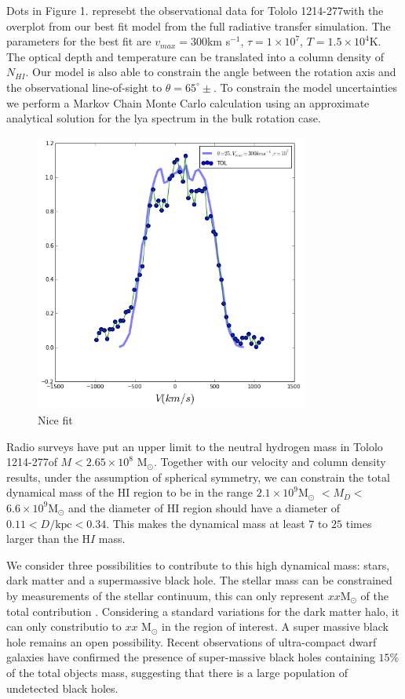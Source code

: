 \documentclass[a4paper, usenatbib, 12pt]{article}
\newcommand{\tol}{Tololo 1214-277}
\newcommand{\kms}{km s$^{-1}$}
\begin{document}
{Dots in Figure 1. represebt the observational data for \tol with the
overplot from our best fit model from the full radiative transfer
simulation.   The parameters for the best fit are
$v_{max}=300$\kms, $\tau=1\times10^7$, $T=1.5\times 10^{4}$K.
The optical depth and temperature can be translated into a column
density of $N_{HI}$. Our model is also able to constrain the angle
between the rotation axis and the observational line-of-sight to $\theta=65^{\circ}\pm$.
To constrain the model uncertainties we perform a Markov Chain Monte
Carlo calculation using an approximate analytical solution for the
lya spectrum in the bulk rotation case.


\begin{figure}
\begin{center}
\includegraphics[width=0.8\textwidth]{tolfit.png}
\caption{Nice fit}
\end{center}
\end{figure}


Radio surveys have put an upper limit to the neutral hydrogen mass in
\tol of $M<2.65\times 10^{8}$ M$_{\odot}$. Together with our velocity
and column density results, under the assumption of spherical
symmetry, we can constrain the total dynamical mass of the HI region
to be in the range $2.1\times 10^{9}$M$_{\odot}$ $<M_D<$  $6.6\times
10^{9}$M$_{\odot}$ and the diameter of HI region should
have a diameter of $0.11 < D/\mathrm{kpc}<0.34$. This makes the
dynamical mass  at least $7$ to $25$ times larger than the H$I$ mass.


We consider three possibilities to contribute to this high
dynamical mass: stars, dark matter and a supermassive black
hole. The stellar mass can be constrained by measurements of the
stellar continuum, this can only represent $xx$M$_{\odot}$ of the total
contribution . Considering a standard variations for the dark matter
halo, it can only constributio to $xx$ M$_{\odot}$ in the region of
interest. A super massive black hole remains an open
possibility. Recent observations of ultra-compact dwarf galaxies
\cite{Seth2014} have confirmed the presence of super-massive black
holes containing $15\%$ of the total objects mass, suggesting that
there is a large population of undetected black holes. 

}
\end{document}
